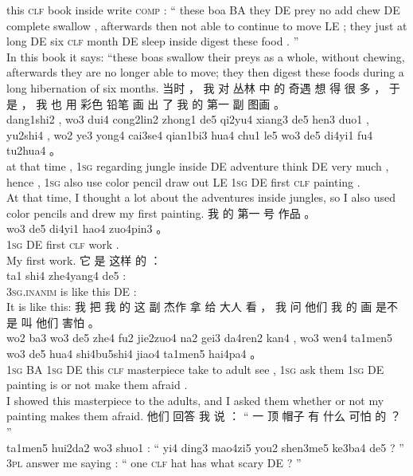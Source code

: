 \documentclass[UTF8]{ctexart}
\begin{document}
\begin{exe}
this \textsc{clf} book inside write \textsc{comp} : `` these boa BA they DE prey no add chew DE complete swallow , afterwards then not {able to} {continue to} move LE ; they just at long DE six \textsc{clf} month DE sleep inside digest these food . ''
\\
\trans In this book it says: ``these boas swallow their preys as a whole, without chewing, afterwards they are no longer able to move; they then digest these foods during a long hibernation of six months. 
\ex
\glll
当时 ， 我 对 丛林 中 的 奇遇 想 得 很 多 ， 于是 ， 我 也 用 彩色 铅笔 画 出 了 我 的 第一 副 图画 。 
\\
dang1shi2 , wo3 dui4 cong2lin2 zhong1 de5 qi2yu4 xiang3 de5 hen3 duo1 , yu2shi4 , wo2 ye3 yong4 cai3se4 qian1bi3 hua4 chu1 le5 wo3 de5 di4yi1 fu4 tu2hua4 。
\\
{at that time} , \textsc{1sg} regarding jungle inside DE adventure think DE very much , hence , \textsc{1sg} also use color pencil draw out LE \textsc{1sg} DE first \textsc{clf} painting .
\\
\trans At that time, I thought a lot about the adventures inside jungles, so I also used color pencils and drew my first painting. 
\ex
\glll
我 的 第一 号 作品 。 
\\
wo3 de5 di4yi1 hao4 zuo4pin3 。 
\\
\textsc{1sg} DE first \textsc{clf} work .
\\
\trans My first work. 
\ex
\glll
它 是 这样 的 ：
\\
ta1 shi4 zhe4yang4 de5 : 
\\
\textsc{3sg.inanim} is {like this} DE :
\\
\trans It is like this:
\ex
\glll
我 把 我 的 这 副 杰作 拿 给 大人 看 ， 我 问 他们 我 的 画 是不是 叫 他们 害怕 。
\\
wo2 ba3 wo3 de5 zhe4 fu2 jie2zuo4 na2 gei3 da4ren2 kan4 , wo3 wen4 ta1men5 wo3 de5 hua4 shi4bu5shi4 jiao4 ta1men5 hai4pa4 。
\\
\textsc{1sg} BA \textsc{1sg} DE this \textsc{clf} masterpiece take to adult see , \textsc{1sg} ask them \textsc{1sg} DE painting {is or not} make them afraid .
\\
\trans I showed this masterpiece to the adults, and I asked them whether or not my painting makes them afraid.
\ex
\glll
他们 回答 我 说 ： “ 一 顶 帽子 有 什么 可怕 的 ？ ”
\\
ta1men5 hui2da2 wo3 shuo1 : `` yi4 ding3 mao4zi5 you2 shen3me5 ke3ba4 de5 ? ''
\\
\textsc{3pl} answer me saying : `` one \textsc{clf} hat has what scary DE ? ''

\end{exe}
\end{document}
